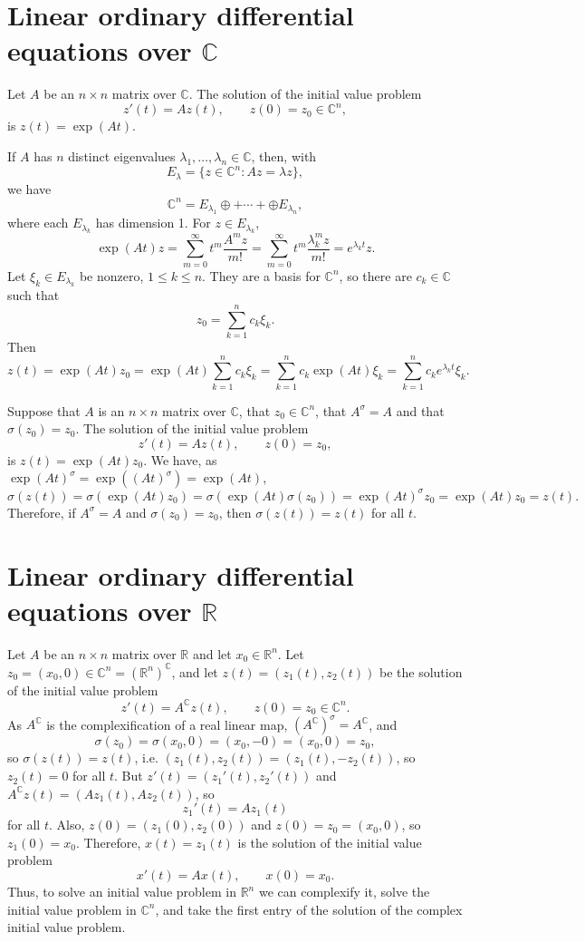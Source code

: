 \documentclass{article}
\begin{document}
\section{Linear ordinary differential equations over $\mathbb{C}$}
Let $A$ be an $n \times n$ matrix over $\mathbb{C}$. The solution of the initial value problem
\[
z'(t)=Az(t), \qquad z(0)=z_0 \in \mathbb{C}^n,
\]
is $z(t)=\exp(At)$. 

If $A$ has $n$ distinct eigenvalues $\lambda_1,\ldots,\lambda_n \in \mathbb{C}$, then, with
\[
E_\lambda=\{z \in \mathbb{C}^n: Az=\lambda z\},
\]
 we have
\[
\mathbb{C}^n = E_{\lambda_1} \oplus + \cdots + \oplus E_{\lambda_n},
\]
where each $E_{\lambda_k}$ has dimension 1. For $z \in E_{\lambda_k}$, 
\[
\exp(At)z=\sum_{m=0}^\infty t^m \frac{A^m z}{m!} = \sum_{m=0}^\infty t^m \frac{\lambda_k^m z}{m!}=e^{\lambda_k t}z.
\]
Let $\xi_k \in E_{\lambda_k}$ be nonzero, $1 \leq k \leq n$. They are a basis for $\mathbb{C}^n$, so there are $c_k \in \mathbb{C}$ such that
\[
z_0=\sum_{k=1}^n c_k \xi_k.
\]
Then
\[
z(t)=\exp(At)z_0=\exp(At)\sum_{k=1}^n c_k \xi_k=\sum_{k=1}^n c_k \exp(At) \xi_k=
\sum_{k=1}^n c_k e^{\lambda_k t} \xi_k.
\]

Suppose that $A$ is an $n \times n$ matrix over $\mathbb{C}$, that $z_0 \in \mathbb{C}^n$, that
$A^\sigma=A$ and that $\sigma(z_0)=z_0$. The solution of the initial value problem 
\[
z'(t)=Az(t), \qquad z(0)=z_0,
\]
is $z(t)=\exp(At)z_0$. We have, as $\exp(At)^\sigma=\exp((At)^\sigma)=\exp(At)$,
\[
\sigma(z(t))=\sigma(\exp(At)z_0)=\sigma(\exp(At)\sigma(z_0))=\exp(At)^\sigma z_0=\exp(At)z_0=z(t).
\]
Therefore, if $A^\sigma=A$ and $\sigma(z_0)=z_0$, then $\sigma(z(t))=z(t)$ for all $t$.

\section{Linear ordinary differential equations over $\mathbb{R}$}
Let $A$ be an $n \times n$ matrix over $\mathbb{R}$ and let $x_0 \in \mathbb{R}^n$. Let $z_0=(x_0,0) \in \mathbb{C}^n=(\mathbb{R}^n)^\mathbb{C}$, and let
$z(t)=(z_1(t),z_2(t))$ be the solution of the initial value problem
\[
z'(t)=A^\mathbb{C} z(t), \qquad z(0)=z_0 \in \mathbb{C}^n.
\]
As $A^\mathbb{C}$ is the complexification of a real linear map, $(A^\mathbb{C})^\sigma=A^\mathbb{C}$, and
\[
\sigma(z_0)=\sigma(x_0,0)=(x_0,-0)=(x_0,0)=z_0,
\]
so $\sigma(z(t))=z(t)$, i.e. $(z_1(t),z_2(t))=(z_1(t),-z_2(t))$, so $z_2(t)=0$ for all $t$.
But $z'(t)=(z_1'(t),z_2'(t))$ and $A^\mathbb{C} z(t)=(Az_1(t),Az_2(t))$,
so
\[
z_1'(t)=Az_1(t)
\]
for all $t$. Also, $z(0)=(z_1(0),z_2(0))$ and $z(0)=z_0=(x_0,0)$, so $z_1(0)=x_0$. Therefore, $x(t)=z_1(t)$ is the solution
of the initial value problem
\[
x'(t)=Ax(t), \qquad x(0)=x_0.
\]
Thus, to solve an initial value problem in $\mathbb{R}^n$ we can complexify it, solve the initial value problem in $\mathbb{C}^n$, and take
the first entry of the solution of the complex initial value problem.
\end{document}
